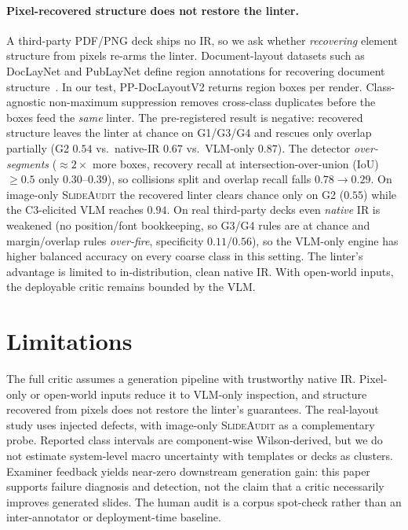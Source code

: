 \documentclass[letterpaper]{article}            %
\newcommand{\g}[1]{\textsf{#1}}        %
\begin{document}
\paragraph{Pixel-recovered structure does not restore the linter.}
A third-party PDF/PNG deck ships no IR, so we ask whether \emph{recovering} element structure from pixels
re-arms the linter. Document-layout datasets such as DocLayNet and PubLayNet define region annotations for recovering document
structure~\citep{doclaynet,publaynet}. In our test, PP-DocLayoutV2 returns region boxes per render.
Class-agnostic non-maximum suppression removes cross-class duplicates before the boxes feed the \emph{same}
linter. The pre-registered result is negative: recovered structure leaves the linter at chance on
\g{G1}/\g{G3}/\g{G4} and rescues only overlap partially (\g{G2} $0.54$ vs.\ native-IR $0.67$ vs.\ VLM-only
$0.87$). The detector \emph{over-segments} ($\approx2\times$ more boxes, recovery recall at intersection-over-union (IoU)${\geq}0.5$
only $0.30$--$0.39$), so collisions split and overlap recall falls $0.78\to0.29$. On image-only
\textsc{SlideAudit} the recovered linter clears chance only on \g{G2} ($0.55$) while the C3-elicited VLM
reaches $0.94$. On real third-party decks even \emph{native} IR is weakened (no position/font bookkeeping, so
\g{G3}/\g{G4} rules are at chance and margin/overlap rules \emph{over-fire}, specificity $0.11$/$0.56$), so
the VLM-only engine has higher balanced accuracy on every coarse class in this setting. The linter's advantage
is limited to in-distribution, clean native IR. With open-world inputs, the deployable critic remains bounded by
the VLM.

\section{Limitations}\label{sec:limits}

The full critic assumes a generation pipeline with trustworthy native IR. Pixel-only or open-world inputs reduce
it to VLM-only inspection, and structure recovered from pixels does not restore the linter's guarantees. The
real-layout study uses injected defects, with image-only \textsc{SlideAudit} as a complementary probe. Reported
class intervals are component-wise Wilson-derived, but we do not estimate system-level macro uncertainty with
templates or decks as clusters. Examiner feedback yields near-zero downstream generation gain: this
paper supports failure diagnosis and detection, not the claim that a critic necessarily improves generated
slides. The human audit is a corpus spot-check rather than an inter-annotator or deployment-time baseline.
\end{document}
